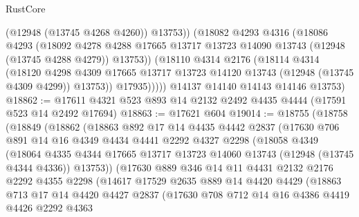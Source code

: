 \begin{lexlean}{RustCore}
\begin{coremodule}
                (@12948 (@13745 @4268 @4260))
                @13753))
            (@18082
              @4293
              @4316
              (@18086
                @4293
                (@18092
                  @4278
                  @4288
                  @17665
                  @13717
                  @13723
                  @14090
                  @13743
                  (@12948 (@13745 @4288 @4279))
                  @13753))
              (@18110
                @4314
                @2176
                (@18114
                  @4314
                  (@18120
                    @4298
                    @4309
                    @17665
                    @13717
                    @13723
                    @14120
                    @13743
                    (@12948 (@13745 @4309 @4299))
                    @13753))
                @17935)))))
      @14137
      @14140
      @14143
      @14146
      @13753)
@18862 := @17611 @4321 @523 @893 @14 @2132 @2492 @4435 @4444 (@17591 @523 @14 @2492 @17694)
@18863 := @17621 @604
@19014 := @18755
    (@18758
      (@18849
        (@18862
          (@18863
            @892
            @17
            @14
            @4435
            @4442
            @2837
            (@17630
              @706
              @891
              @14
              @16
              @4349
              @4434
              @4441
              @2292
              @4327
              @2298
              (@18058
                @4349
                (@18064
                  @4335
                  @4344
                  @17665
                  @13717
                  @13723
                  @14060
                  @13743
                  (@12948 (@13745 @4344 @4336))
                  @13753))
              (@17630
                @889
                @346
                @14
                @11
                @4431
                @2132
                @2176
                @2292
                @4355
                @2298
                (@14617
                  @17529
                  @2635
                  @889
                  @14
                  @4420
                  @4429
                  (@18863
                    @713
                    @17
                    @14
                    @4420
                    @4427
                    @2837
                    (@17630
                      @708
                      @712
                      @14
                      @16
                      @4386
                      @4419
                      @4426
                      @2292
                      @4363

\end{coremodule}
\end{lexlean}
